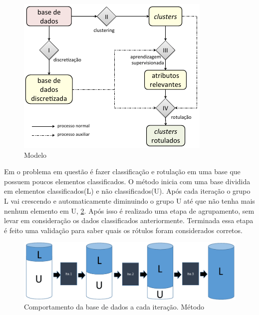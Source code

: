 \begin{figure}[h]
        \centering
        \includegraphics[scale=0.8]{figs/modeloLopes.png}
        \caption{Modelo \cite{Lopes}} 
        \label{fig:modeloLOPES}
\end{figure}


Em \cite{Metodo2015} o problema em questão é fazer classificação e rotulação em uma base que possuem poucos elementos classificados. O método inicia com uma base dividida em elementos classificados(L) e não classificados(U). Após cada iteração o grupo L vai crescendo e automaticamente diminuindo o grupo U até que não tenha mais nenhum elemento em U, \ref{fig:modeloVicente}. Após isso é realizado uma etapa de agrupamento, sem levar em consideração os dados classificados anteriormente. Terminada essa etapa é feito uma validação para saber quais os rótulos foram considerados corretos.
\begin{figure}[!h]
        \centering
        \includegraphics[scale=0.4]{figs/modeloVicente.png}
        \caption{Comportamento da base de dados a cada iteração. Método \cite{Filho2015}} \label{fig:modeloVicente}
\end{figure}

